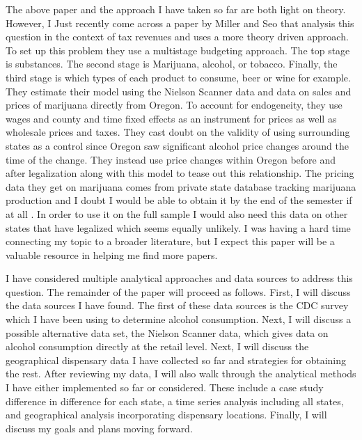 \documentclass[11pt]{article}
\begin{document}
The above paper and the approach I have taken so far are both light on theory. However, I Just recently come across a paper by Miller and Seo that analysis this question in the context of tax revenues and uses a more theory driven approach. To set up this problem they use a multistage budgeting approach. The top stage is substances. The second stage is Marijuana, alcohol, or tobacco. Finally, the third stage is which types of each product to consume, beer or wine for example. They estimate their model using the Nielson Scanner data and data on sales and prices of marijuana directly from Oregon. To account for endogeneity, they use wages and county and time fixed effects as an instrument for prices as well as wholesale prices and taxes.  They cast doubt on the validity of using surrounding states as a control since Oregon saw significant alcohol price changes around the time of the change. They instead use price changes within Oregon before and after legalization along with this model to tease out this relationship. The pricing data they get on marijuana comes from private state database tracking marijuana production and I doubt I would be able to obtain it by the end of the semester if at all \cite{miller_seo_2018}. In order to use it on the full sample I would also need this data on other states that have legalized which seems equally unlikely.  I was having a hard time connecting my topic to a broader literature, but I expect this paper will be a valuable resource in helping me find more papers. \par

I have considered multiple analytical approaches and data sources to address this question. The remainder of the paper will proceed as follows. First, I will discuss the data sources I have found. The first of these data sources is the CDC survey which I have been using to determine alcohol consumption. Next, I will discuss a possible alternative data set, the Nielson Scanner data, which gives data on alcohol consumption directly at the retail level. Next, I will discuss the geographical dispensary data I have collected so far and strategies for obtaining the rest. After reviewing my data, I will also walk through the analytical methods I have either implemented so far or considered. These include a case study difference in difference for each state, a time series analysis including all states, and geographical analysis incorporating dispensary locations.   Finally, I will discuss my goals and plans moving forward.


\end{document}
